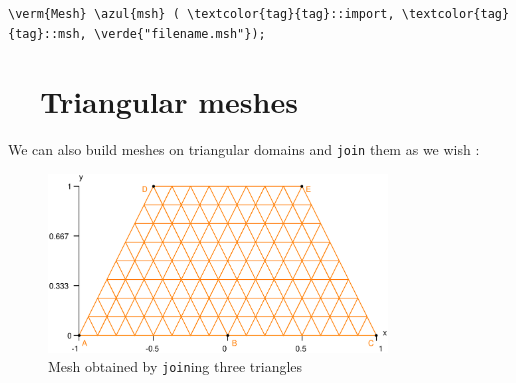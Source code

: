\begin{Verbatim}[commandchars=\\\{\},formatcom=\small\tt,baselinestretch=0.94]
   \verm{Mesh} \azul{msh} ( \textcolor{tag}{tag}::import, \textcolor{tag}{tag}::msh, \verde{"filename.msh"});
\end{Verbatim}


\section{~~Triangular meshes}\label{\numb section 1.\numb parag 5}

We can also build meshes on triangular domains and {\small\tt join} them as we wish :

\begin{figure}[ht] \centering
  \includegraphics[width=90mm]{three-tri}
  \caption{Mesh obtained by {\small\tt join}ing three triangles}
  \label{\numb section 1.\numb fig 7}
\end{figure}


